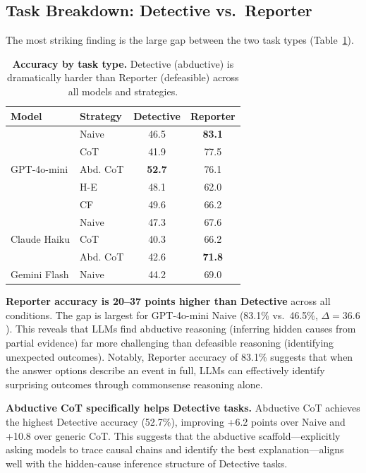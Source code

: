 \documentclass[10pt,twocolumn,letterpaper]{article}
\begin{document}
\subsection{Task Breakdown: Detective vs.\ Reporter}

The most striking finding is the large gap between the two task types (Table~\ref{tab:task}).

\begin{table}[t]
\centering
\small
\caption{\textbf{Accuracy by task type.} Detective (abductive) is dramatically harder than Reporter (defeasible) across all models and strategies.}
\label{tab:task}
\begin{tabular}{@{}llcc@{}}
\toprule
Model & Strategy & Detective & Reporter \\
\midrule
\multirow{5}{*}{GPT-4o-mini}
 & Naive & 46.5 & \textbf{83.1} \\
 & CoT & 41.9 & 77.5 \\
 & Abd. CoT & \textbf{52.7} & 76.1 \\
 & H-E & 48.1 & 62.0 \\
 & CF & 49.6 & 66.2 \\
\midrule
\multirow{3}{*}{Claude Haiku}
 & Naive & 47.3 & 67.6 \\
 & CoT & 40.3 & 66.2 \\
 & Abd. CoT & 42.6 & \textbf{71.8} \\
\midrule
Gemini Flash & Naive & 44.2 & 69.0 \\
\bottomrule
\end{tabular}
\vspace{-3mm}
\end{table}

\textbf{Reporter accuracy is 20--37 points higher than Detective} across all conditions. The gap is largest for GPT-4o-mini Naive (83.1\% vs.\ 46.5\%, $\Delta = 36.6$). This reveals that LLMs find abductive reasoning (inferring hidden causes from partial evidence) far more challenging than defeasible reasoning (identifying unexpected outcomes). Notably, Reporter accuracy of 83.1\% suggests that when the answer options describe an event in full, LLMs can effectively identify surprising outcomes through commonsense reasoning alone.

\textbf{Abductive CoT specifically helps Detective tasks.} Abductive CoT achieves the highest Detective accuracy (52.7\%), improving +6.2 points over Naive and +10.8 over generic CoT. This suggests that the abductive scaffold---explicitly asking models to trace causal chains and identify the best explanation---aligns well with the hidden-cause inference structure of Detective tasks.
\end{document}
